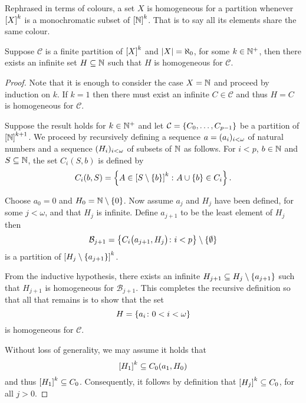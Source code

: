 Rephrased in terms of colours, a set $X$ is homogeneous for a partition whenever
$\subsets{k}{X}$ is a monochromatic subset of $\subsets{k}{\nats}$.  That is to
say all its elements share the same colour.

\begin{thm}
	Suppose $\mathcal{C}$ is a finite partition of $\subsets{k}{X}$ and
	$\card{X}=\aleph_0$, for some $k\in\posnats$, then there exists an infinite
	set $H\subseteq\nats$ such that $H$ is homogeneous for $\mathcal{C}$.
\end{thm}
\begin{proof}
	Note that it is enough to consider the case $X=\nats$ and proceed by
	induction on $k$. If $k=1$ then there must exist an infinite
	$C\in\mathcal{C}$ and thus $H=C$ is homogeneous for $\mathcal{C}$.

	Suppose the result holds for $k\in\posnats$ and let
	$\mathcal{C}=\set{C_0,\dotsc,C_{p-1}}$ be a partition of
	$\subsets{k+1}{\nats}$.  We proceed by recursively defining a sequence
	$a=\family{a_i}{i<\omega}$ of natural numbers and a sequence
	$\family{H_i}{i<\omega}$ of subsets of $\nats$ as follows.  For $i<p$,
	$b\in\nats$ and $S\subseteq\nats$, the set $C_i(S,b)$ is defined by
	\begin{equation}
		C_i(b,S)=\setbuild{A\in\subsets{k}{S\setminus\set{b}}}{A\cup\set{b}\in
		C_i}.
	\end{equation}

	Choose $a_0=0$ and $H_0=\nats\setminus\set{0}$.  Now assume $a_j$ and $H_j$
	have been defined, for some $j<\omega$, and that $H_j$ is infinite.  Define
	$a_{j+1}$ to be the least element of $H_j$ then
	\begin{equation}
		\mathcal{B}_{j+1}=\setbuild{C_i\big(a_{j+1},H_j\big)}{
		i<p}\setminus\set{\emptyset}
	\end{equation}
	is a partition of $\subsets{k}{H_j\setminus\set{a_{j+1}}}$.

	From the inductive hypothesis, there exists an infinite $H_{j+1}\subseteq
	H_j\setminus\set{a_{j+1}}$ such that $H_{j+1}$ is homogeneous for
	$\mathcal{B}_{j+1}$.  This completes the recursive definition so that all that
	remains is to show that the set
	\begin{equation}
		H=\setbuild{a_i}{0<i<\omega}
	\end{equation}
	is homogeneous for $\mathcal{C}$.

	Without loss of generality, we may assume it holds that
	\begin{equation}
		\subsets{k}{H_1}\subseteq C_0(a_1,H_0)
	\end{equation}
	and thus $\subsets{k}{H_1}\subseteq C_0$.  Consequently, it follows by
	definition that $\subsets{k}{H_j}\subseteq C_0$, for all $j>0$.


\end{proof}
